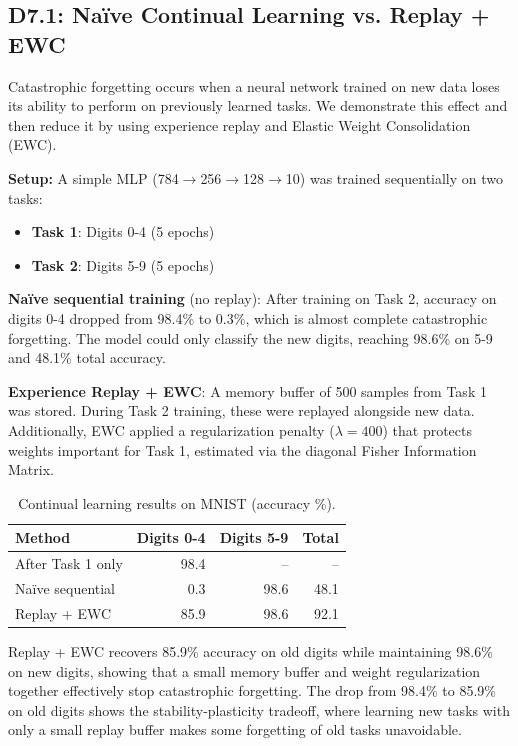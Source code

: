\documentclass[10pt,twocolumn,letterpaper]{article}
\begin{document}
\subsection{D7.1: Na\"ive Continual Learning vs. Replay + EWC}

Catastrophic forgetting occurs when a neural network trained on new data loses its ability to perform on previously learned tasks. We demonstrate this effect and then reduce it by using experience replay and Elastic Weight Consolidation (EWC).

\textbf{Setup:} A simple MLP (784$\to$256$\to$128$\to$10) was trained sequentially on two tasks:
\begin{itemize}
    \item \textbf{Task 1}: Digits 0-4 (5 epochs)
    \item \textbf{Task 2}: Digits 5-9 (5 epochs)
\end{itemize}

\textbf{Na\"ive sequential training} (no replay): After training on Task 2, accuracy on digits 0-4 dropped from 98.4\% to 0.3\%, which is almost complete catastrophic forgetting. The model could only classify the new digits, reaching 98.6\% on 5-9 and 48.1\% total accuracy.

\textbf{Experience Replay + EWC}: A memory buffer of 500 samples from Task 1 was stored. During Task 2 training, these were replayed alongside new data. Additionally, EWC applied a regularization penalty ($\lambda=400$) that protects weights important for Task 1, estimated via the diagonal Fisher Information Matrix.

\begin{table}[h]
\centering
\caption{Continual learning results on MNIST (accuracy \%).}
\label{tab:continual}
\begin{tabular}{@{} l r r r @{}}
\toprule
\textbf{Method} & \textbf{Digits 0-4} & \textbf{Digits 5-9} & \textbf{Total} \\
\midrule
After Task 1 only & 98.4 & -- & -- \\
Na\"ive sequential & 0.3 & 98.6 & 48.1 \\
Replay + EWC & 85.9 & 98.6 & 92.1 \\
\bottomrule
\end{tabular}
\end{table}

Replay + EWC recovers 85.9\% accuracy on old digits while maintaining 98.6\% on new digits, showing that a small memory buffer and weight regularization together effectively stop catastrophic forgetting. The drop from 98.4\% to 85.9\% on old digits shows the stability-plasticity tradeoff, where learning new tasks with only a small replay buffer makes some forgetting of old tasks unavoidable.
\end{document}
